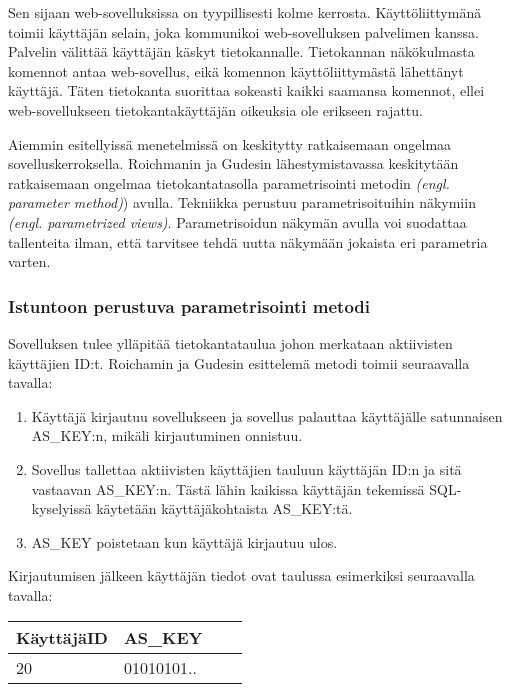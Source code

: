 \documentclass[finnish]{tktltiki2}
\theoremstyle{definition}
\theoremstyle{remark}
\begin{document}
		Sen sijaan web-sovelluksissa on tyypillisesti kolme kerrosta. Käyttöliittymänä toimii käyttäjän selain, joka kommunikoi web-sovelluksen palvelimen kanssa. Palvelin välittää käyttäjän käskyt tietokannalle. Tietokannan näkökulmasta komennot antaa web-sovellus, eikä komennon käyttöliittymästä lähettänyt käyttäjä. Täten tietokanta suorittaa sokeasti kaikki saamansa komennot, ellei web-sovellukseen tietokantakäyttäjän oikeuksia ole erikseen rajattu.
		
		Aiemmin esitellyissä menetelmissä on keskitytty ratkaisemaan ongelmaa sovelluskerroksella. Roichmanin ja Gudesin lähestymistavassa keskitytään ratkaisemaan ongelmaa tietokantatasolla parametrisointi metodin \textit{(engl. parameter method)}) avulla. Tekniikka perustuu parametrisoituihin näkymiin \textit{(engl. parametrized views)}. Parametrisoidun näkymän avulla voi suodattaa tallenteita ilman, että tarvitsee tehdä uutta näkymään jokaista eri parametria varten.
		
		\subsubsection {Istuntoon perustuva parametrisointi metodi}
		Sovelluksen tulee ylläpitää tietokantataulua johon merkataan aktiivisten käyttäjien ID:t. Roichamin ja Gudesin esittelemä metodi toimii seuraavalla tavalla:
		\begin{enumerate}
			\item Käyttäjä kirjautuu sovellukseen ja sovellus palauttaa käyttäjälle satunnaisen AS\_KEY:n, mikäli kirjautuminen onnistuu.
			
			\item Sovellus tallettaa aktiivisten käyttäjien tauluun käyttäjän ID:n ja sitä vastaavan AS\_KEY:n. Tästä lähin kaikissa käyttäjän tekemissä SQL-kyselyissä käytetään käyttäjäkohtaista AS\_KEY:tä.
			
			\item AS\_KEY poistetaan kun käyttäjä kirjautuu ulos.
		\end{enumerate}
		
		Kirjautumisen jälkeen käyttäjän tiedot ovat taulussa esimerkiksi seuraavalla tavalla:
	
		\begin{center}
		\begin{tabular}{| l | l | l | l |}
			\hline
			KäyttäjäID & AS\_KEY \\ \hline
			\hline
			20 &  01010101.. \\
			\hline
		\end{tabular}
		\end{center}
	
\end{document}
